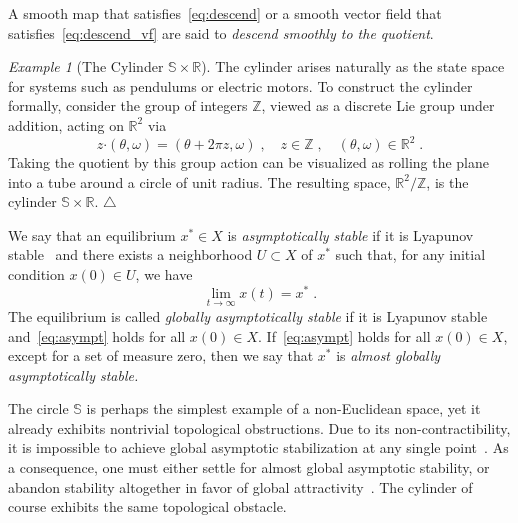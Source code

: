 \documentclass{article}
\theoremstyle{definition}
\theoremstyle{remark}
\newtheorem{example}{Example}
\newcommand{\bscdot}{\boldsymbol{\cdot}}
\newcommand\xqed[1]{%
  \leavevmode\unskip\penalty9999 \hbox{}\nobreak\hfill
  \quad\hbox{#1}}
\newcommand\eexa{\xqed{$\triangle$}}
\newcommand{\lie}{\mathcal{L}}	%
\newcommand{\IN}{\mathbb{Z}}	%
\newcommand{\MA}{X}	%
\newcommand{\NE}{U}	%
\newcommand{\RR}{\mathbb{R}}	%
\newcommand{\SP}{\mathbb{S}}	%
\begin{document}
A smooth map that satisfies~\eqref{eq:descend} or a smooth vector field that satisfies~\eqref{eq:descend_vf} are said
to \emph{descend smoothly to the quotient}. 


\begin{example}[The Cylinder $\SP\times\RR$]
 The cylinder arises naturally as the state space for systems such as pendulums or electric motors.
 To construct the cylinder formally, consider the group of integers $\IN$, viewed as a discrete Lie group under addition,
 acting on $\RR^2$ via
 \begin{equation} \label{eq:action_cylinder}
  z\bscdot(\theta,\omega) = (\theta+2\pi z, \omega) \;, \quad z \in \IN \;, \quad (\theta,\omega) \in \RR^2 \;.
 \end{equation}
 Taking the quotient by this group action can be visualized as rolling the plane into a tube around a circle of unit radius.
 The resulting space, $\RR^2/\IN$, is the cylinder $\SP \times \RR$. 
 \eexa
\end{example}

We say that an equilibrium $x^* \in \MA$ is \emph{asymptotically stable} if it is Lyapunov stable~\cite{khalil} and
there exists a neighborhood $\NE \subset \MA$ of $x^*$ such that, for any initial condition $x(0) \in \NE$, we have
\begin{equation} \label{eq:asympt}
 \lim_{t \to \infty} x(t) = x^* \;.
\end{equation}
The equilibrium is called \emph{globally asymptotically stable} if it is Lyapunov stable and~\eqref{eq:asympt}
holds for all $x(0) \in \MA$. If~\eqref{eq:asympt} holds for all $x(0) \in \MA$, except for a set of measure zero,
then we say that $x^*$ is \emph{almost globally asymptotically stable.}

The circle $\SP$ is perhaps the simplest example of a non-Euclidean space, yet it already exhibits nontrivial
topological obstructions. Due to its non-contractibility, it is impossible to achieve global asymptotic stabilization
at any single point~\cite{bhat2000}. As a consequence, one must either settle for almost global asymptotic stability,
or abandon stability altogether in favor of global attractivity~\cite{jongeneel}. The cylinder of course exhibits the
same topological obstacle.
\end{document}
